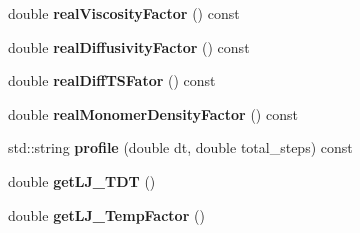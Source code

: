 \begin{DoxyCompactItemize}
double {\bfseries real\+Viscosity\+Factor} () const
\item 
\mbox{\label{classUnits_ad664b380e5c4805b78c833336ad2fbad}} 
double {\bfseries real\+Diffusivity\+Factor} () const
\item 
\mbox{\label{classUnits_a778ab09aa07d1dc0a86f0cf1cdb8b310}} 
double {\bfseries real\+Diff\+T\+S\+Fator} () const
\item 
\mbox{\label{classUnits_ab43ed93d577f49a4be265d6cfbaff6af}} 
double {\bfseries real\+Monomer\+Density\+Factor} () const
\item 
\mbox{\label{classUnits_a9550469cd29905befbc5d0fdabfb8122}} 
std\+::string {\bfseries profile} (double dt, double total\+\_\+steps) const
\item 
\mbox{\label{classUnits_a9ca7ea5e6c0f1817cd845cf10cebd414}} 
double {\bfseries get\+L\+J\+\_\+\+T\+DT} ()
\item 
\mbox{\label{classUnits_adde64b0cab9316332de4ee7a371d55f9}} 
double {\bfseries get\+L\+J\+\_\+\+Temp\+Factor} ()
\end{DoxyCompactItemize}
